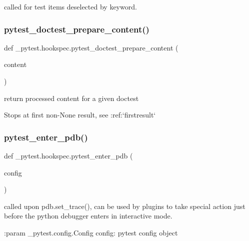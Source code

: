 \begin{DoxyVerb}called for test items deselected by keyword. \end{DoxyVerb}
 \mbox{\label{namespace__pytest_1_1hookspec_aa42483ab50d5e8bbd7be8bab17ece9a8}} 
\subsubsection{\texorpdfstring{pytest\+\_\+doctest\+\_\+prepare\+\_\+content()}{pytest\_doctest\_prepare\_content()}}
{\footnotesize\ttfamily def \+\_\+pytest.\+hookspec.\+pytest\+\_\+doctest\+\_\+prepare\+\_\+content (\begin{DoxyParamCaption}\item[{}]{content }\end{DoxyParamCaption})}

\begin{DoxyVerb}return processed content for a given doctest

Stops at first non-None result, see :ref:`firstresult` \end{DoxyVerb}
 \mbox{\label{namespace__pytest_1_1hookspec_a504e4cd5404c91bed16b35ca3f88d7fc}} 
\subsubsection{\texorpdfstring{pytest\+\_\+enter\+\_\+pdb()}{pytest\_enter\_pdb()}}
{\footnotesize\ttfamily def \+\_\+pytest.\+hookspec.\+pytest\+\_\+enter\+\_\+pdb (\begin{DoxyParamCaption}\item[{}]{config }\end{DoxyParamCaption})}

\begin{DoxyVerb}called upon pdb.set_trace(), can be used by plugins to take special
action just before the python debugger enters in interactive mode.

:param _pytest.config.Config config: pytest config object
\end{DoxyVerb}
 \mbox{\label{namespace__pytest_1_1hookspec_a9977923cb828cdb0483f3192304221d3}} 
